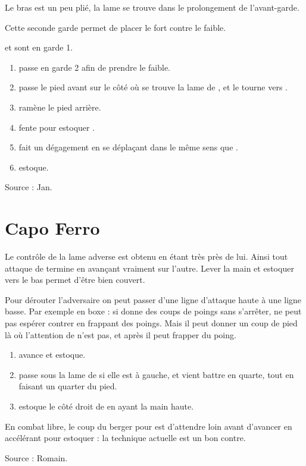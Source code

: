 \begin{garde}

Le bras est un peu plié, la lame se trouve dans le prolongement de l'avant-garde.

\end{garde}

Cette seconde garde permet de placer le fort contre le faible.


\begin{technique}
\A et \D sont en garde 1.

\begin{enumerate}
	\item \A passe en garde 2 afin de prendre le faible.
	\item \A passe le pied avant sur le côté où se trouve la lame de \D, et le tourne vers \D.
	\item \A ramène le pied arrière.
	\item \A fente pour estoquer \D.
	\item \D fait un dégagement en se déplaçant dans le même sens que \A.
	\item \D estoque.
\end{enumerate}

Source : Jan.

\end{technique}


\section{Capo Ferro}

Le contrôle de la lame adverse est obtenu en étant très près de lui.
Ainsi tout attaque de termine en avançant vraiment sur l'autre.
Lever la main et estoquer vers le bas permet d'être bien couvert.

Pour dérouter l'adversaire on peut passer d'une ligne d'attaque haute à une ligne basse.
Par exemple en boxe : si \A donne des coups de poings sans s'arrêter, \D ne peut pas espérer contrer en frappant des poings.
Mais il peut donner un coup de pied là où l'attention de \A n'est pas, et après il peut frapper du poing.


\begin{technique}

\begin{enumerate}
	\item \A avance et estoque.
	\item \D passe sous la lame de \D si elle est à gauche, et vient battre en quarte, tout en faisant un quarter du pied.
	\item \D estoque le côté droit de \A en ayant la main haute.
\end{enumerate}

En combat libre, le coup du berger pour \A est d'attendre loin avant d'avancer en accélérant pour estoquer : la technique actuelle est un bon contre.

Source : Romain.

\end{technique}


